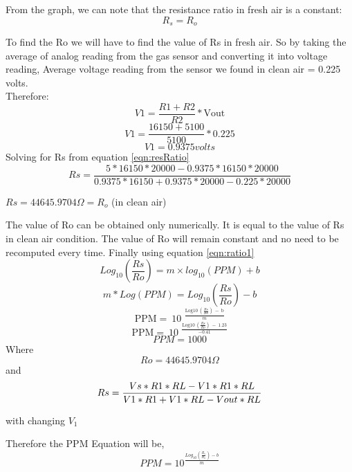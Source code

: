 				From the graph, we can note that the resistance ratio in fresh air is a constant: \\
				\[R_s = R_o\]
				\par To find the Ro we will have to find the value of Rs in fresh air. So by taking the average of analog reading from the gas sensor and converting it into voltage reading, Average voltage reading from the sensor we found in clean air = 0.225 volts. \\
				Therefore: \\
				\[V1= \frac{R\mathrm{1+}R\mathrm{2}}{R\mathrm{2}}*\mathrm{Vout}\]
				\[V1= \frac{\mathrm{16150+5100}}{\mathrm{5100}}*0.225\]
				\[V1= 0.9375 volts\]
				Solving for Rs from equation \ref{eqn:resRatio} \\
				\[Rs=\frac{5*16150*20000-0.9375*16150*20000}{0.9375*16150+0.9375*20000-0.225*20000}\] 
				\begin{center}
				$Rs = 44645.9704\Omega = R_o $ (in clean air)
				\end{center}
				\par The value of Ro can be obtained only numerically. It is equal to the value of Rs in clean air condition. The value of Ro will remain constant and no need to be recomputed every time.
				Finally using equation \ref{eqn:ratio1} \\
				\[Log_10(\frac{Rs}{Ro}) = m\times log_10(PPM) + b\]
				\[m * Log(PPM) = Log_10(\frac{Rs}{Ro}) - b\] 
				\[\mathrm{PPM=\ }{\mathrm{10}}^{\ \ \frac{\mathrm{Log}\mathrm{10\ }\left(\frac{Rs}{Ro}\right)\mathrm{\ -\ b}}{m}}\] 		
				\[\mathrm{PPM=\ }{\mathrm{10}}^{\ \ \frac{\mathrm{Log}\mathrm{10\ }\left(\frac{Rs}{Ro}\right)\mathrm{\ -\ 1.23}}{-0.41}}\] 
				\[PPM=1000\]
				Where \\
				\[Ro=44645.9704\Omega  \]
				and \\
				
				\[\small Rs=\frac{Vs*R1*RL-V1*R1*RL}{V1*R1+V1*RL-Vout*RL}\] 
				
				\begin{center}
				 with changing $V_1$ \\
				\end{center}
				Therefore the PPM Equation will be,\\
				\[PPM = 10^\frac{Log_10(\frac{R_s}{R_o})-b}{m}\]
			
				
		
	